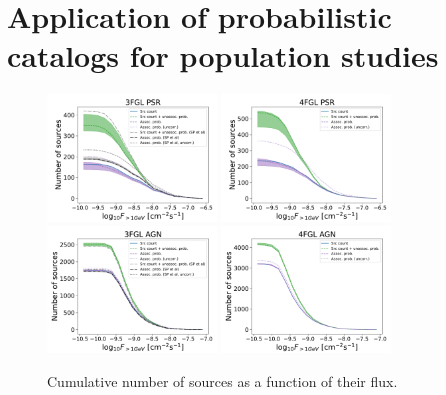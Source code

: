 \section{Application of probabilistic catalogs for population studies}



\begin{figure}[h]
\includegraphics[width=0.4\textwidth]{plots/N_logS_3FGL_PSR_SazP.pdf}
\includegraphics[width=0.4\textwidth]{plots/N_logS_4FGL_PSR.pdf} \\
\includegraphics[width=0.4\textwidth]{plots/N_logS_3FGL_AGN_SazP.pdf}
\includegraphics[width=0.4\textwidth]{plots/N_logS_4FGL_AGN.pdf}
\caption{Cumulative number of sources as a function of their flux.}  
\label{fig:logN_logS}
\end{figure}


